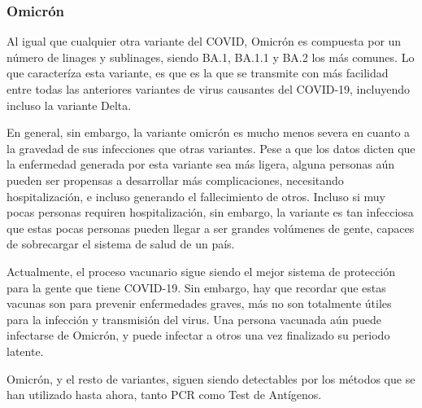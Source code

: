 \subsubsection*{Omicrón}
Al igual que cualquier otra variante del COVID, Omicrón es compuesta por un número de linages y sublinages, siendo BA.1, BA.1.1 y BA.2 los más comunes. Lo que caracteríza esta variante, es que es la que se transmite con más facilidad entre todas las anteriores variantes de virus causantes del COVID-19, incluyendo incluso la variante Delta.

En general, sin embargo, la variante omicrón es mucho menos severa en cuanto a la gravedad de sus infecciones que otras variantes. Pese a que los datos dicten que la enfermedad generada por esta variante sea más ligera, alguna personas aún pueden ser propensas a desarrollar más complicaciones, necesitando hospitalización, e incluso generando el fallecimiento de otros. Incluso si muy pocas personas requiren hospitalización, sin embargo, la variante es tan infecciosa que estas pocas personas pueden llegar a ser grandes volúmenes de gente, capaces de sobrecargar el sistema de salud de un país.

Actualmente, el proceso vacunario sigue siendo el mejor sistema de protección para la gente que tiene COVID-19. Sin embargo, hay que recordar que estas vacunas son para prevenir enfermedades graves, más no son totalmente útiles para la infección y transmisión del virus. Una persona vacunada aún puede infectarse de Omicrón, y puede infectar a otros una vez finalizado su periodo latente.

Omicrón, y el resto de variantes, siguen siendo detectables por los métodos que se han utilizado hasta ahora, tanto PCR como Test de Antígenos.
